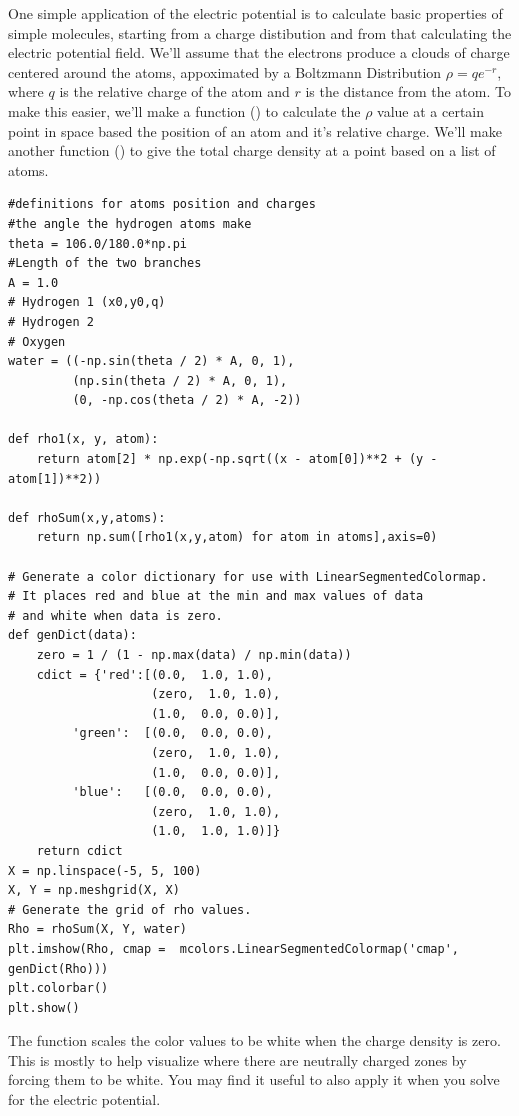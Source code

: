 One simple application of the electric potential is to calculate basic properties of simple molecules, starting from a charge distibution and from that calculating the electric potential field.
We'll assume that the electrons produce a clouds of charge centered around the atoms, appoximated by a Boltzmann Distribution $\rho = q e^{-r}$, where $q$ is the relative charge of the atom and $r$ is the distance from the atom. 
To make this easier, we'll make a function () to calculate the $\rho$ value at a certain point in space based the position of an atom and it's relative charge. 
We'll make another function () to give the total charge density at a point based on a list of atoms.

\begin{lstlisting}
#definitions for atoms position and charges
#the angle the hydrogen atoms make
theta = 106.0/180.0*np.pi
#Length of the two branches
A = 1.0
# Hydrogen 1 (x0,y0,q)
# Hydrogen 2 
# Oxygen
water = ((-np.sin(theta / 2) * A, 0, 1),
         (np.sin(theta / 2) * A, 0, 1),
         (0, -np.cos(theta / 2) * A, -2))

def rho1(x, y, atom):
    return atom[2] * np.exp(-np.sqrt((x - atom[0])**2 + (y - atom[1])**2))

def rhoSum(x,y,atoms):
    return np.sum([rho1(x,y,atom) for atom in atoms],axis=0)

# Generate a color dictionary for use with LinearSegmentedColormap.
# It places red and blue at the min and max values of data
# and white when data is zero.
def genDict(data):
    zero = 1 / (1 - np.max(data) / np.min(data))
    cdict = {'red':[(0.0,  1.0, 1.0),
                   	(zero,  1.0, 1.0),
                   	(1.0,  0.0, 0.0)],
         'green':  [(0.0,  0.0, 0.0),
                   	(zero,  1.0, 1.0),
                   	(1.0,  0.0, 0.0)],
         'blue':   [(0.0,  0.0, 0.0),
                   	(zero,  1.0, 1.0),
                   	(1.0,  1.0, 1.0)]}
    return cdict
X = np.linspace(-5, 5, 100)
X, Y = np.meshgrid(X, X)
# Generate the grid of rho values.
Rho = rhoSum(X, Y, water)
plt.imshow(Rho, cmap =  mcolors.LinearSegmentedColormap('cmap', genDict(Rho)))
plt.colorbar()
plt.show()
\end{lstlisting}
The function  scales the color values to be white when the charge density is zero.
This is mostly to help visualize where there are neutrally charged zones by forcing them to be white.
You may find it useful to also apply it when you solve for the electric  potential.

